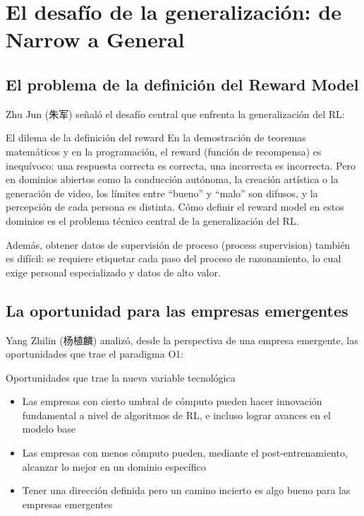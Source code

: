 \section{El desafío de la generalización: de Narrow a General}

\subsection{El problema de la definición del Reward Model}

Zhu Jun (朱军) señaló el desafío central que enfrenta la generalización del RL:

\begin{warningbox}{El dilema de la definición del reward}
En la demostración de teoremas matemáticos y en la programación, el reward (función de recompensa) es inequívoco: una respuesta correcta es correcta, una incorrecta es incorrecta. Pero en dominios abiertos como la conducción autónoma, la creación artística o la generación de video, los límites entre ``bueno'' y ``malo'' son difusos, y la percepción de cada persona es distinta. Cómo definir el reward model en estos dominios es el problema técnico central de la generalización del RL.
\end{warningbox}

Además, obtener datos de supervisión de proceso (process supervision) también es difícil: se requiere etiquetar cada paso del proceso de razonamiento, lo cual exige personal especializado y datos de alto valor.

\subsection{La oportunidad para las empresas emergentes}

Yang Zhilin (杨植麟) analizó, desde la perspectiva de una empresa emergente, las oportunidades que trae el paradigma O1:

\begin{knowledgebox}{Oportunidades que trae la nueva variable tecnológica}
\begin{itemize}
\item Las empresas con cierto umbral de cómputo pueden hacer innovación fundamental a nivel de algoritmos de RL, e incluso lograr avances en el modelo base
\item Las empresas con menos cómputo pueden, mediante el post-entrenamiento, alcanzar lo mejor en un dominio específico
\item Tener una dirección definida pero un camino incierto es algo bueno para las empresas emergentes
\end{itemize}
\end{knowledgebox}

